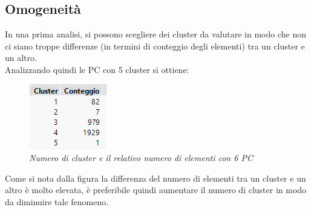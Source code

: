 \subsection{Omogeneità}
In una prima analisi, si possono scegliere dei cluster da valutare in modo che non ci siano troppe differenze (in termini di conteggio degli elementi) tra un cluster e un altro.
\\Analizzando quindi le PC con 5 cluster si ottiene:
\begin{figure}[H]
	\centering
\includegraphics{img/hw1/cluster5.png}
\caption{\textit{Numero di cluster e il relativo numero di elementi con 6 PC}}
\end{figure}
Come si nota dalla figura la differenza del numero di elementi tra un cluster e un altro è molto elevata, è preferibile quindi aumentare il numero di cluster in modo da diminuire tale fenomeno.
